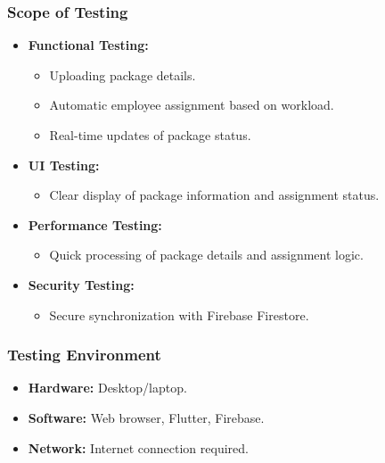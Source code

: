 \documentclass{article}
\begin{document}
\subsubsection{Scope of Testing}
\begin{itemize}
    \item \textbf{Functional Testing:}
    \begin{itemize}
        \item Uploading package details.
        \item Automatic employee assignment based on workload.
        \item Real-time updates of package status.
    \end{itemize}
    \item \textbf{UI Testing:}
    \begin{itemize}
        \item Clear display of package information and assignment status.
    \end{itemize}
    \item \textbf{Performance Testing:}
    \begin{itemize}
        \item Quick processing of package details and assignment logic.
    \end{itemize}
    \item \textbf{Security Testing:}
    \begin{itemize}
        \item Secure synchronization with Firebase Firestore.
    \end{itemize}
\end{itemize}

\subsubsection{Testing Environment}
\begin{itemize}
    \item \textbf{Hardware:} Desktop/laptop.
    \item \textbf{Software:} Web browser, Flutter, Firebase.
    \item \textbf{Network:} Internet connection required.
\end{itemize}
\end{document}
